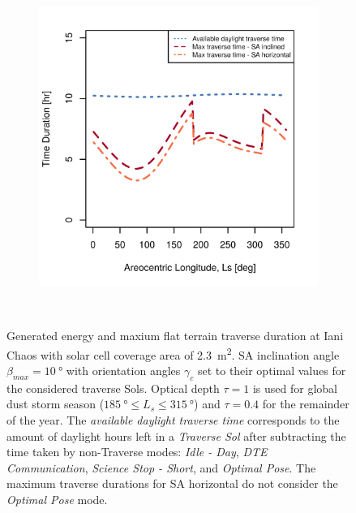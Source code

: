 \begin{figure}[h]
\begin{subfigure}[t]{\subfigureWidth}
        \includegraphics[height=\graphicsHeight]{sections/power-system-design/solar-array/plots/ianichaos-75w-max-traverse-durations-for-solar-cell-coverage-area-23m2.png}
		\label{fig:plot:sub:iani-chaos-max-traverse-durations}
	\end{subfigure}\\[0.8ex]
    \caption[Generated energy and maxium flat terrain traverse durations at Iani Chaos]
            {Generated energy and maxium flat terrain traverse duration at Iani Chaos with solar cell coverage area of \SI{2.3}{m^{2}}. \ac{SA} inclination angle $\beta_{max} = \SI{10}{\degree}$ with orientation angles $\gamma_{c}$ set to their optimal values for the considered traverse Sols. Optical depth $\tau = 1$ is used for global dust storm season ($\SI{185}{\degree} \leq L_{s} \leq \SI{315}{\degree}$) and $\tau = 0.4$ for the remainder of the year. The \textit{available daylight traverse time} corresponds to the amount of daylight hours left in a \textit{Traverse Sol} after subtracting the time taken by non-Traverse modes: \textit{Idle - Day}, \textit{\ac{DTE} Communication}, \textit{Science Stop - Short}, and \textit{Optimal Pose}. The maximum traverse durations for \ac{SA} horizontal do not consider the \textit{Optimal Pose} mode.}
    \label{fig:plot:iani-chaos-generated-energy-and-max-traverse-durations}
\vspace{-2ex}
\end{figure}

